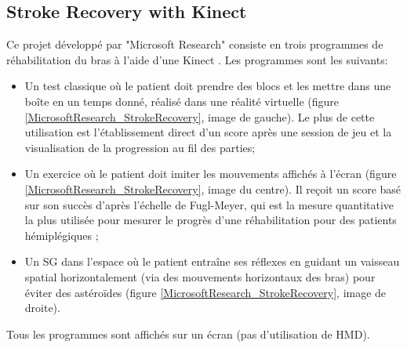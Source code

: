 	\subsection*{Stroke Recovery with Kinect}
		Ce projet développé par "Microsoft Research"\cite{MicrosoftResearch} consiste en trois programmes de réhabilitation du bras à l'aide d'une Kinect \cite{Microsoft_StrokeRecovery}. Les programmes sont les suivants:
		\begin{itemize}
			\item Un test classique où le patient doit prendre des blocs et les mettre dans une boîte en un temps donné, réalisé dans une réalité virtuelle (figure \ref{MicrosoftResearch_StrokeRecovery}, image de gauche). Le plus de cette utilisation est l'établissement direct d'un score après une session de jeu et la visualisation de la progression au fil des parties;
			\item Un exercice où le patient doit imiter les mouvements affichés à l'écran (figure \ref{MicrosoftResearch_StrokeRecovery}, image du centre). Il reçoit un score basé sur son succès d'après l'échelle de Fugl-Meyer, qui est la mesure quantitative la plus utilisée pour mesurer le progrès d'une réhabilitation pour des patients hémiplégiques \cite{FuglMeyerAssesment};
			\item Un SG dans l'espace où le patient entraîne ses réflexes en guidant un vaisseau spatial horizontalement (via des mouvements horizontaux des bras) pour éviter des astéroïdes (figure \ref{MicrosoftResearch_StrokeRecovery}, image de droite).
		\end{itemize}
		Tous les programmes sont affichés sur un écran (pas d'utilisation de HMD).\medskip
		
		\begin{minipage}{\linewidth}
			\label{MicrosoftResearch_StrokeRecovery}
		\end{minipage}\medskip
		
